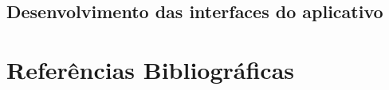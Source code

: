 \documentclass[hidelinks,12pt]{article}
\begin{document}
\subsection{Desenvolvimento das interfaces do aplicativo}
\newpage
\section*{Refer\^encias Bibliogr\'aficas}
\renewcommand\refname{}


\end{document}
